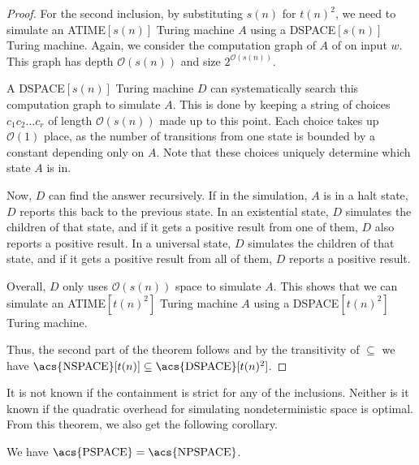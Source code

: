 \begin{proof}
    \vspace{5mm}

    \sloppy For the second inclusion, by substituting $s(n)$ for $t(n)^2$, we need to simulate an \acs{ATIME}$[s(n)]$ Turing machine $A$ using a \acs{DSPACE}$[s(n)]$ Turing machine.
    Again, we consider the computation graph of $A$ of on input $w$.
    This graph has depth $\mathcal{O}(s(n))$ and size $2^{\mathcal{O}(s(n))}$.

    A \acs{DSPACE}$[s(n)]$ Turing machine $D$ can systematically search this computation graph to simulate $A$.
    This is done by keeping a string of choices $c_{1}c_{2}\dots c_r$ of length $\mathcal{O}(s(n))$ made up to this point.
    Each choice takes up $\mathcal{O}(1)$ place, as the number of transitions from one state is bounded by a constant depending only on $A$.
    Note that these choices uniquely determine which state $A$ is in.

    Now, $D$ can find the answer recursively.
    If in the simulation, $A$ is in a halt state, $D$ reports this back to the previous state.
    In an existential state, $D$ simulates the children of that state, and if it gets a positive result from one of them, $D$ also reports a positive result.
    In a universal state, $D$ simulates the children of that state, and if it gets a positive result from all of them, $D$ reports a positive result.

    Overall, $D$ only uses $\mathcal{O}(s(n))$ space to simulate $A$.
    This shows that we can simulate an \acs{ATIME}$[t(n)^2]$ Turing machine $A$ using a \acs{DSPACE}$[t(n)^2]$ Turing machine.

    Thus, the second part of the theorem follows and by the transitivity of $\subseteq$ we have $\text{\acs{NSPACE}}[t(n)] \subseteq \text{\acs{DSPACE}}[t(n)^2]$.
\end{proof}

It is not known if the containment is strict for any of the inclusions.
Neither is it known if the quadratic overhead for simulating nondeterministic space is optimal.
From this theorem, we also get the following corollary.

\begin{corollary}
    We have $\text{\upshape \acs{PSPACE}} = \text{\upshape \acs{NPSPACE}}$.
\end{corollary}

